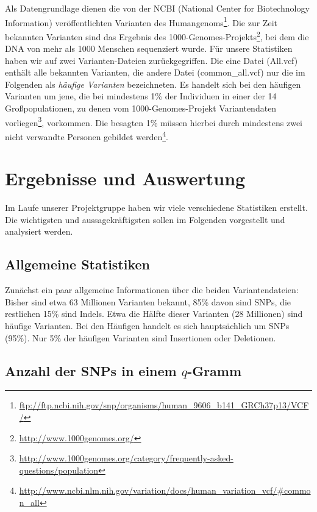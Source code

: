 Als Datengrundlage dienen die von der NCBI (National Center for Biotechnology Information) veröffentlichten Varianten des Humangenoms\footnote{
\url{ftp://ftp.ncbi.nih.gov/snp/organisms/human_9606_b141_GRCh37p13/VCF/}
}. Die zur Zeit bekannten Varianten sind das Ergebnis des 1000-Genomes-Projekts\footnote{
\url{http://www.1000genomes.org/}
}, bei dem die DNA von mehr als 1000 Menschen sequenziert wurde. Für unsere Statistiken haben wir auf zwei Varianten-Dateien zurückgegriffen. Die eine Datei
(\glqq All.vcf\grqq )
enthält alle bekannten Varianten, die andere Datei 
(\glqq common\_all.vcf\grqq ) nur die im Folgenden als \emph{häufige Varianten} bezeichneten.
Es handelt sich bei den häufigen Varianten um jene, die bei mindestens 1\% der Individuen in einer der 14 Großpopulationen, zu denen vom 1000-Genomes-Projekt Variantendaten vorliegen\footnote{
\url{http://www.1000genomes.org/category/frequently-asked-questions/population}
}, vorkommen.
Die besagten 1\% müssen hierbei durch mindestens zwei nicht verwandte Personen gebildet werden\footnote{
\url{http://www.ncbi.nlm.nih.gov/variation/docs/human_variation_vcf/\#common_all}
}.
\newpage

\section{Ergebnisse und Auswertung} 
\label{sec:stats:res}

Im Laufe unserer Projektgruppe haben wir viele verschiedene Statistiken erstellt. Die wichtigsten und aussagekräftigsten sollen im Folgenden vorgestellt und analysiert werden.

\subsection{Allgemeine Statistiken}
\label{sec:stats:res:allg}

Zunächst ein paar allgemeine Informationen über die beiden Variantendateien: Bisher sind etwa 63 Millionen Varianten bekannt, 85\% davon sind SNPs, die restlichen 15\% sind Indels. Etwa die Hälfte dieser Varianten (28 Millionen) sind häufige Varianten. Bei den Häufigen handelt es sich hauptsächlich um SNPs (95\%). Nur 5\% der häufigen Varianten sind Insertionen oder Deletionen. 

\subsection{Anzahl der SNPs in einem \texorpdfstring{$q$}{q}-Gramm}
\label{sec:stats:res:variantsq16}

